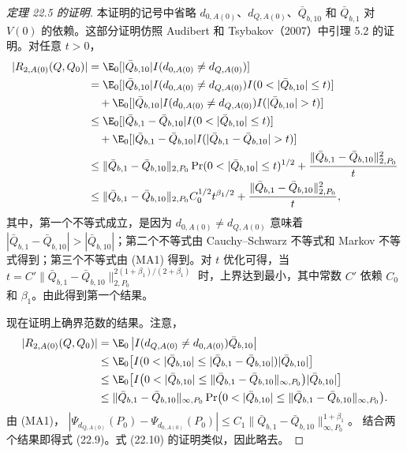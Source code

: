 \begin{proof}[定理 22.5 的证明]
本证明的记号中省略 $d_{0,A(0)}$、$d_{Q,A(0)}$、$\bar Q_{b,10}$ 和 $\bar Q_{b,1}$ 对 $V(0)$ 的依赖。这部分证明仿照 Audibert 和 Tsybakov（2007）中引理 5.2 的证明。对任意 $t>0$，
\[
\begin{aligned}
 |R_{2,A(0)}(Q,Q_0)|
 &=\E_0[|\bar Q_{b,10}|I(d_{0,A(0)}\ne d_{Q,A(0)})]\\
 &=\E_0[|\bar Q_{b,10}|I(d_{0,A(0)}\ne d_{Q,A(0)})I(0<|\bar Q_{b,10}|\leq t)]\\
 &\quad+\E_0[|\bar Q_{b,10}|I(d_{0,A(0)}\ne d_{Q,A(0)})I(|\bar Q_{b,10}|>t)]\\
 &\leq\E_0[|\bar Q_{b,1}-\bar Q_{b,10}|I(0<|\bar Q_{b,10}|\leq t)]\\
 &\quad+\E_0[|\bar Q_{b,1}-\bar Q_{b,10}|I(|\bar Q_{b,1}-\bar Q_{b,10}|>t)]\\
 &\leq\|\bar Q_{b,1}-\bar Q_{b,10}\|_{2,P_0}
 \Pr(0<|\bar Q_{b,10}|\leq t)^{1/2}
 +\frac{\|\bar Q_{b,1}-\bar Q_{b,10}\|_{2,P_0}^2}{t}\\
 &\leq\|\bar Q_{b,1}-\bar Q_{b,10}\|_{2,P_0}C_0^{1/2}t^{\beta_1/2}
 +\frac{\|\bar Q_{b,1}-\bar Q_{b,10}\|_{2,P_0}^2}{t},
\end{aligned}
\]
其中，第一个不等式成立，是因为 $d_{0,A(0)}\ne d_{Q,A(0)}$ 意味着
$|\bar Q_{b,1}-\bar Q_{b,10}|>|\bar Q_{b,10}|$；第二个不等式由 Cauchy--Schwarz 不等式和 Markov 不等式得到；第三个不等式由 (MA1) 得到。对 $t$ 优化可得，当
$t=C'\|\bar Q_{b,1}-\bar Q_{b,10}\|_{2,P_0}^{2(1+\beta_1)/(2+\beta_1)}$
时，上界达到最小，其中常数 $C'$ 依赖 $C_0$ 和 $\beta_1$。由此得到第一个结果。

现在证明上确界范数的结果。注意，
\[
\begin{aligned}
 |R_{2,A(0)}(Q,Q_0)|
 &=\E_0\left|I(d_{Q,A(0)}\ne d_{0,A(0)})\bar Q_{b,10}\right|\\
 &\leq\E_0\bigl[I(0<|\bar Q_{b,10}|\leq|\bar Q_{b,1}-\bar Q_{b,10}|)
 |\bar Q_{b,10}|\bigr]\\
 &\leq\E_0\bigl[I\bigl(0<|\bar Q_{b,10}|\leq
 \|\bar Q_{b,1}-\bar Q_{b,10}\|_{\infty,P_0}\bigr)|\bar Q_{b,10}|\bigr]\\
 &\leq\|\bar Q_{b,1}-\bar Q_{b,10}\|_{\infty,P_0}
 \Pr\bigl(0<|\bar Q_{b,10}|\leq\|\bar Q_{b,1}-\bar Q_{b,10}\|_{\infty,P_0}\bigr).
\end{aligned}
\]
由 (MA1)，
$|\Psi_{d_{Q,A(0)}}(P_0)-\Psi_{d_{0,A(0)}}(P_0)|
\leq C_1\|\bar Q_{b,1}-\bar Q_{b,10}\|_{\infty,P_0}^{1+\beta_1}$。
结合两个结果即得式 (22.9)。式 (22.10) 的证明类似，因此略去。
\end{proof}
